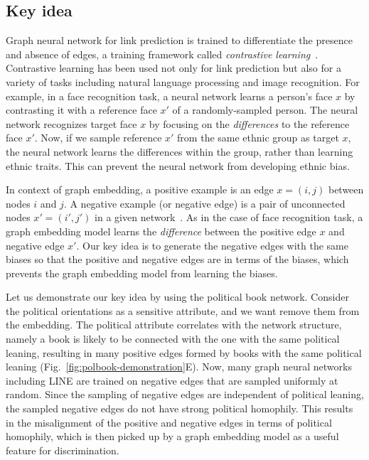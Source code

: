 \documentclass{article}
\theoremstyle{plain}
\theoremstyle{definition}
\theoremstyle{remark}
\begin{document}
\subsection{Key idea}

Graph neural network for link prediction is trained to differentiate the presence and absence of edges, a training framework called \textit{contrastive learning}~\cite{kojakuResidual2VecDebiasingGraph2021,dyer2014,Gutmann2010}.
Contrastive learning has been used not only for link prediction but also for a variety of tasks including natural language processing and image recognition. For example, in a face recognition task, a neural network learns a person's face $x$ by contrasting it with a reference face $x'$ of a randomly-sampled person.
The neural network recognizes target face $x$ by focusing on the \textit{differences} to the reference face $x'$.
Now, if we sample reference $x'$ from the same ethnic group as target $x$, the neural network learns the differences within the group, rather than learning ethnic traits. This can prevent the neural network from developing ethnic bias.

In context of graph embedding, a positive example is an edge $x=(i,j)$ between nodes $i$ and $j$. A negative example (or negative edge) is a pair of unconnected nodes $x'=(i',j')$ in a given network~\cite{kojakuResidual2VecDebiasingGraph2021}.
As in the case of face recognition task, a graph embedding model learns the \textit{difference} between the positive edge $x$ and negative edge $x'$. Our key idea is to generate the negative edges with the same biases so that the positive and negative edges are  in terms of the biases, which prevents the graph embedding model from learning the biases. 

Let us demonstrate our key idea by using the political book network.
Consider the political orientations as a sensitive attribute, and we want remove them from the embedding. 
The political attribute correlates with the network structure, namely a book is likely to be connected with the one with the same political leaning, resulting in many positive edges formed by books with the same political leaning (Fig.~\ref{fig:polbook-demonstration}E).
Now, many graph neural networks including LINE are trained on negative edges that are sampled uniformly at random.
Since the sampling of negative edges are independent of political leaning, the sampled negative edges do not have strong political homophily.
This results in the misalignment of the positive and negative edges in terms of political homophily, which is then picked up by a graph embedding model as a useful feature for discrimination.
\end{document}
